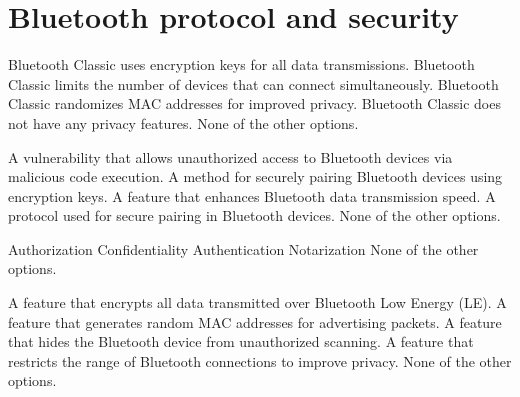 \section{Bluetooth protocol and security}

\begin{checkboxes}
    \choice Bluetooth Classic uses encryption keys for all data transmissions.
    \choice Bluetooth Classic limits the number of devices that can connect simultaneously.
    \choice Bluetooth Classic randomizes MAC addresses for improved privacy.
    \CorrectChoice Bluetooth Classic does not have any privacy features.
    \choice None of the other options.
\end{checkboxes}

\begin{checkboxes}
    \choice A vulnerability that allows unauthorized access to Bluetooth devices via malicious code execution.
    \choice A method for securely pairing Bluetooth devices using encryption keys.
    \choice A feature that enhances Bluetooth data transmission speed.
    \choice A protocol used for secure pairing in Bluetooth devices.
    \CorrectChoice None of the other options.
\end{checkboxes}

\begin{checkboxes}
    \CorrectChoice Authorization
    \CorrectChoice Confidentiality
    \CorrectChoice Authentication
    \choice Notarization
    \choice None of the other options.
\end{checkboxes}




\begin{checkboxes}
    \choice A feature that encrypts all data transmitted over Bluetooth Low Energy (LE).
    \CorrectChoice A feature that generates random MAC addresses for advertising packets.
    \choice A feature that hides the Bluetooth device from unauthorized scanning.
    \choice A feature that restricts the range of Bluetooth connections to improve privacy.
    \choice None of the other options.
\end{checkboxes}


